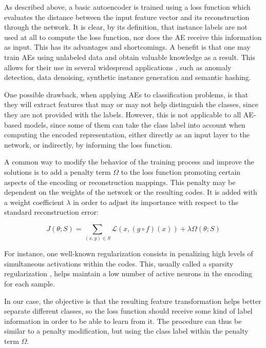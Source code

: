 \documentclass[
	fontsize=11pt, %
	twoside=false, %
	open=any, %
	secnumdepth=1, %
]{kaobook}
\begin{document}
As described above, a basic autoencoder is trained using a loss function which evaluates the distance between the input feature vector and its reconstruction through the network. It is clear, by its definition, that instance labels are not used at all to compute the loss function, nor does the AE receive this information as input. This has its advantages and shortcomings. A benefit is that one may train AEs using unlabeled data and obtain valuable knowledge as a result. This allows for their use in several widespread applications \cite{CHARTE202093}, such as anomaly detection, data denoising, synthetic instance generation and semantic hashing.

One possible drawback, when applying AEs to classification problems, is that they will extract features that may or may not help distinguish the classes, since they are not provided with the labels. However, this is not applicable to all AE-based models, since some of them can take the class label into account when computing the encoded representation, either directly as an input layer to the network, or indirectly, by informing the loss function.

A common way to modify the behavior of the training process and improve the solutions is to add a penalty term $\Omega$ to the loss function promoting certain aspects of the encoding or reconstruction mappings. This penalty may be dependent on the weights of the network or the resulting codes. It is added with a weight coefficient $\lambda$ in order to adjust its importance with respect to the standard reconstruction error:

\begin{equation}J\left(\theta;S\right)=\sum_{(x,y)\in S}\mathcal L\left(x,\left(g\circ f\right)\left(x\right)\right) + \lambda\Omega\left(\theta;S\right)\end{equation}

For instance, one well-known regularization consists in penalizing high levels of simultaneous activations within the codes. This, usually called a sparsity regularization \cite{ng2011sparse}, helps maintain a low number of active neurons in the encoding for each sample.

In our case, the objective is that the resulting feature transformation helps better separate different classes, so the loss function should receive some kind of label information in order to be able to learn from it. The procedure can thus be similar to a penalty modification, but using the class label within the penalty term $\Omega$.
\end{document}
